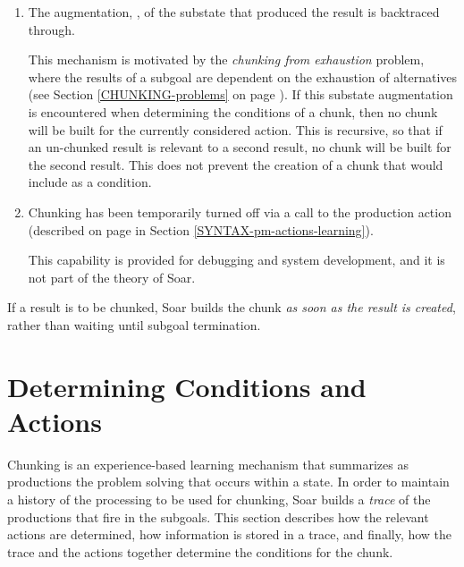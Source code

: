 \begin{enumerate}
\item The augmentation, , of the substate that
	produced the result is backtraced through.

	This mechanism is motivated by the \emph{chunking from exhaustion}
	problem, where the results of a subgoal are dependent on the
	exhaustion of alternatives (see Section \ref{CHUNKING-problems} on page
	\pageref{CHUNKING-problems}). If this substate augmentation is
	encountered when determining the conditions of a chunk, then no chunk
	will be built for the currently considered action. This is recursive, 
	so that if an un-chunked result is relevant to a second result, no 
	chunk will be built for the second result. This does not prevent the
	creation of a chunk that would include  as a
	condition.  
	 
      
\item Chunking has been temporarily turned off via a call to the
	 production action (described on page
	\pageref{SYNTAX-pm-actions-learning} in Section 
	\ref{SYNTAX-pm-actions-learning}).

	This capability is provided for debugging and system development, and
	it is not part of the theory of Soar.
\end{enumerate}

If a result is to be chunked, Soar builds the chunk \emph{as soon as the
result is created}, rather than waiting until subgoal termination.


\section{Determining Conditions and Actions}
\label{CHUNKING-determining}

Chunking is an experience-based learning mechanism that summarizes  as 
productions the problem solving that occurs within a state. In order to 
maintain a
history of the processing to be used for chunking, Soar builds a 
\emph{trace} of the productions that fire in the subgoals. This section
describes how the relevant actions are determined, how information is 
stored in a trace, and finally, how the trace and the actions together 
determine the conditions for the chunk.

